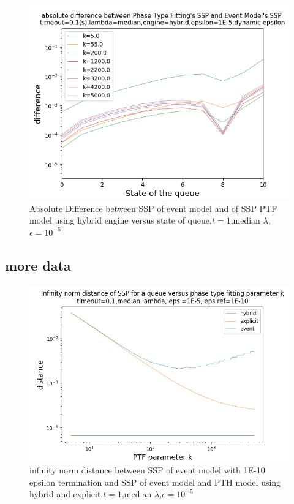 \documentclass[paper=a4, fontsize=11pt]{scrartcl}
\numberwithin{equation}{section}		%
\numberwithin{figure}{section}			%
\numberwithin{table}{section}				%
\begin{document}
\begin{figure}
	\centering
	\includegraphics[width=17cm]{picture/New_model/diff_hybrid_dynamic.png}
	\caption{Absolute Difference between SSP of event model and of SSP PTF model using hybrid engine versus state of queue,$t=1$,median $\lambda$,$\epsilon=10^{-5}$}
	\label{fig:dist_dynamic_hybrid}
\end{figure}

\subsection{more data}
\begin{figure}
	\centering
	\includegraphics[width=17cm]{picture/New_model/distance_versus_k.png}
	\caption{infinity norm distance between SSP of event model with 1E-10 epsilon termination and SSP of event model and PTH model using hybrid and explicit,$t=1$,median $\lambda$,$\epsilon=10^{-5}$}
	\label{fig:dist_versus_k}
\end{figure}
\end{document}
